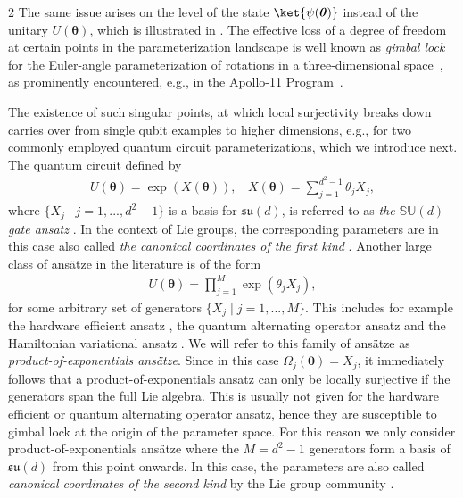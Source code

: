 \documentclass{article}
\renewcommand{\vec}[1]{\ensuremath{\boldsymbol{#1}}}
\begin{document}
\begin{multicols}{2}
The same issue arises on the level of the state \(\ket{\psi(\vec{\theta})}\) instead of the unitary \(U(\vec{\theta})\), which is illustrated in .
The effective loss of a degree of freedom at certain points in the parameterization landscape is well known as \textit{gimbal lock} for the Euler-angle parameterization of rotations in a three-dimensional 
space~\cite{BMM13}, as prominently encountered, e.g., in the Apollo-11 Program~\cite{HOR18}.

The existence of such singular points, at which local surjectivity breaks down carries over from single qubit examples to higher dimensions, e.g., for two commonly employed quantum circuit parameterizations, which we introduce next. The quantum circuit defined by 
\begin{align}
\label{def:canonical_coordinates_first_kind}
U(\vec{\theta})=\exp(X(\vec{\theta})),~~~~X(\vec{\theta})=\sum_{j=1}^{d^{2}-1}\theta_{j}X_{j},
\end{align} 
where $\{X_{j} \mid j = 1, ..., d^2-1\}$ is a basis for $\mathfrak{su}(d)$, is referred to as \emph{the \(\mathbb{SU}(d)\)-gate ansatz} \cite{wiersema_here_2024, wiersema_geometric_2025, wierichs_symmetric_2023, banchi_measuring_2021, chen_special-unitary_2025}. In the context of Lie groups, the corresponding parameters are in this case also called \textit{the canonical coordinates of the first kind} \cite{hilgert_structure_2012}. 
Another large class of ansätze in the literature is of the form
\begin{align}
\label{def:canonical_coordinates_second_kind}
U(\vec{\theta})=\prod_{j = 1}^{M} \exp(\theta_j X_j),
\end{align}
for some arbitrary set of generators \(\{X_j \mid j = 1,...,M\}\).
This includes for example the hardware efficient ansatz \cite{cerezo_variational_2021, kandala_hardware-efficient_2017, leone_practical_2024, xiao_physics-constrained_2024}, the quantum alternating operator ansatz \cite{farhi_quantum_2014, wang_quantum_2023, hadfield_quantum_2019, golden_quantum_2023} and the Hamiltonian variational ansatz \cite{wecker_progress_2015, park_hamiltonian_2024, anselme_martin_simulating_2022}. We will refer to this family of ans\"atze as \emph{product-of-exponentials ansätze}.
Since in this case \(\Omega_j (\vec{0}) = X_j\), it immediately follows that a product-of-exponentials ansatz can only be locally surjective if the generators span the full Lie algebra.
This is usually not given for the hardware efficient or quantum alternating operator ansatz, hence they are susceptible to gimbal lock at the origin of the parameter space.
For this reason we only consider product-of-exponentials ansätze where the \(M = d^2-1\) generators form a basis of \(\mathfrak{su}(d)\) from this point onwards. In this case, the parameters are also called \textit{canonical coordinates of the second kind} by the Lie group community \cite{hilgert_structure_2012}.


\end{multicols}
\end{document}
